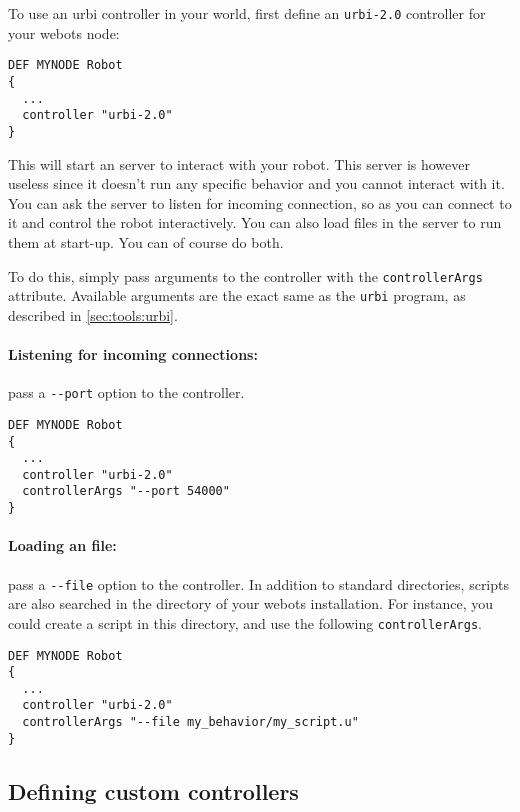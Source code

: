 To use an urbi controller in your \webots world, first define an
\verb+urbi-2.0+ controller for your webots node:

\begin{verbatim}
DEF MYNODE Robot
{
  ...
  controller "urbi-2.0"
}
\end{verbatim}

This will start an \urbi server to interact with your robot. This
server is however useless since it doesn't run any specific behavior
and you cannot interact with it. You can ask the \urbi server to
listen for incoming connection, so as you can connect to it and
control the robot interactively. You can also load \us files in the
server to run them at start-up. You can of course do both.

To do this, simply pass arguments to the controller with the
\verb+controllerArgs+ \webots attribute. Available arguments are the
exact same as the \verb+urbi+ program, as described in
\autoref{sec:tools:urbi}.

\paragraph{Listening for incoming connections:} pass a \verb+--port+
option to the controller.

\begin{verbatim}
DEF MYNODE Robot
{
  ...
  controller "urbi-2.0"
  controllerArgs "--port 54000"
}
\end{verbatim}

\paragraph{Loading an \us file:} pass a \verb+--file+ option to the
controller. In addition to standard directories, scripts are also
searched in the  directory of
your webots installation. For instance, you could create a
 script in this directory, and use the
following \verb+controllerArgs+.

\begin{verbatim}
DEF MYNODE Robot
{
  ...
  controller "urbi-2.0"
  controllerArgs "--file my_behavior/my_script.u"
}
\end{verbatim}

\subsection{Defining custom \urbi controllers}

